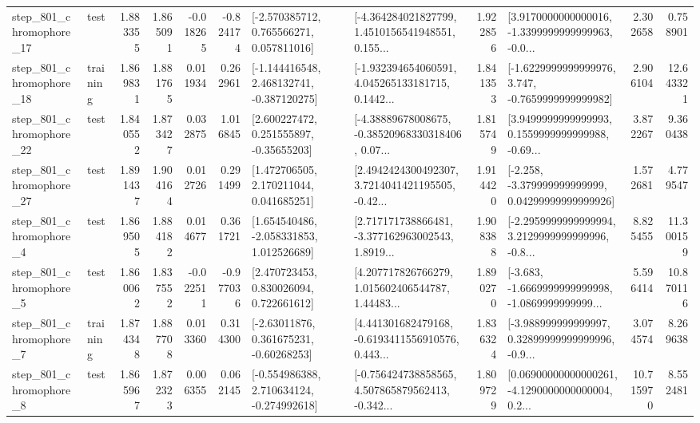 \begin{tabular}{llrrrrllrlrr}
  step\_801\_chromophore\_17 &      test &      1.883355 &    1.865091 &     -0.018265 & -0.824174 &    [-2.570385712, 0.765566271, 0.057811016] &  [-4.364284021827799, 1.4510156541948551, 0.155... &       1.922856 &  [3.9170000000000016, -1.3399999999999963, -0.0... &            2.302658 &          0.758901 \\
  step\_801\_chromophore\_18 &  training &      1.869831 &    1.881765 &      0.011934 &  0.262961 &   [-1.144416548, 2.468132741, -0.387120275] &  [-1.932394654060591, 4.045265133181715, 0.1442... &       1.841353 &  [-1.6229999999999976, 3.747, -0.7659999999999982] &            2.906104 &         12.643321 \\
  step\_801\_chromophore\_22 &      test &      1.840552 &    1.873427 &      0.032875 &  1.016845 &     [2.600227472, 0.251555897, -0.35655203] &  [-4.38889678008675, -0.38520968330318406, 0.07... &       1.815749 &  [3.9499999999999993, 0.1559999999999988, -0.69... &            3.872267 &          9.360438 \\
  step\_801\_chromophore\_27 &      test &      1.891437 &    1.904164 &      0.012726 &  0.291499 &     [1.472706505, 2.170211044, 0.041685251] &  [2.4942424300492307, 3.7214041421195505, -0.42... &       1.914420 &  [-2.258, -3.379999999999999, 0.04299999999999926] &            1.572681 &          4.779547 \\
   step\_801\_chromophore\_4 &      test &      1.869505 &    1.884182 &      0.014677 &  0.361721 &    [1.654540486, -2.058331853, 1.012526689] &  [2.717171738866481, -3.377162963002543, 1.8919... &       1.908388 &  [-2.2959999999999994, 3.2129999999999996, -0.8... &            8.825455 &         11.300159 \\
   step\_801\_chromophore\_5 &      test &      1.860062 &    1.837552 &     -0.022511 & -0.977036 &     [2.470723453, 0.830026094, 0.722661612] &  [4.207717826766279, 1.015602406544787, 1.44483... &       1.890270 &  [-3.683, -1.6669999999999998, -1.0869999999999... &            5.596414 &         10.870116 \\
   step\_801\_chromophore\_7 &  training &      1.874348 &    1.887708 &      0.013360 &  0.314300 &     [-2.63011876, 0.361675231, -0.60268253] &  [4.441301682479168, -0.6193411556910576, 0.443... &       1.836324 &  [-3.988999999999997, 0.32899999999999996, -0.9... &            3.074574 &          8.269638 \\
   step\_801\_chromophore\_8 &      test &      1.865967 &    1.872323 &      0.006355 &  0.062145 &   [-0.554986388, 2.710634124, -0.274992618] &  [-0.756424738858565, 4.507865879562413, -0.342... &       1.809729 &  [0.06900000000000261, -4.1290000000000004, 0.2... &           10.715970 &          8.552481 \\

\end{tabular}
